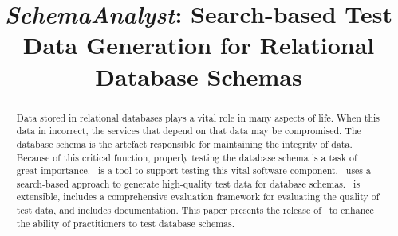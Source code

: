 \documentclass[conference]{IEEEtran}
\begin{document}
\title{\textit{SchemaAnalyst}: Search-based Test Data Generation for Relational Database Schemas}

\author{
\and
{}
}
\maketitle

\begin{abstract}

Data stored in relational databases plays a vital role in many aspects of life.  When this data in incorrect, the
services that depend on that data may be compromised.  The database schema is the artefact responsible for maintaining
the integrity of data. Because of this critical function, properly testing the database schema is a task of great
importance.  \sa~is a tool to support testing this vital software component.  \sa~uses a search-based approach to
generate high-quality test data for database schemas. \sa~is extensible, includes a comprehensive evaluation framework
for evaluating the quality of test data, and includes documentation. This paper presents the release of \sa~to enhance
the ability of practitioners to test database schemas.

\end{abstract}










\end{document}
